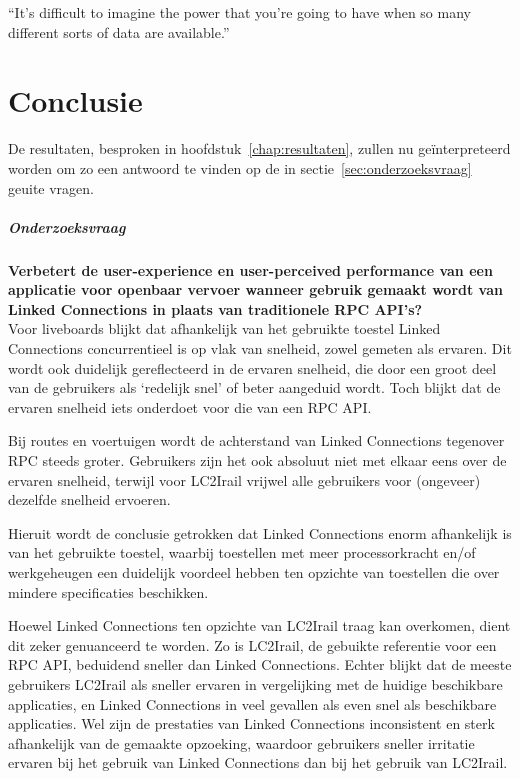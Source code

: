 \begin{savequote}[0.55\linewidth]
	``It’s difficult to imagine the power that you’re going to have when so many different sorts of data are available.''
\end{savequote}

\chapter{Conclusie}
\label{chap:interpretatie}

De resultaten, besproken in hoofdstuk~\ref{chap:resultaten}, zullen nu geïnterpreteerd worden om zo een antwoord te vinden op de in sectie~\ref{sec:onderzoeksvraag} geuite vragen.

\paragraph{Onderzoeksvraag}  \textbf{Verbetert de user-experience en user-perceived performance van een applicatie voor openbaar vervoer wanneer gebruik gemaakt wordt van Linked Connections in plaats van traditionele RPC API's?}\\

Voor liveboards blijkt dat afhankelijk van het gebruikte toestel Linked Connections concurrentieel is op vlak van snelheid, zowel gemeten als ervaren. Dit wordt ook duidelijk gereflecteerd in de ervaren snelheid, die door een groot deel van de gebruikers als `redelijk snel' of beter aangeduid wordt. Toch blijkt dat de ervaren snelheid iets onderdoet voor die van een RPC API.

Bij routes en voertuigen wordt de achterstand van Linked Connections tegenover RPC steeds groter. Gebruikers zijn het ook absoluut niet met elkaar eens over de ervaren snelheid, terwijl voor LC2Irail vrijwel alle gebruikers voor (ongeveer) dezelfde snelheid ervoeren.

Hieruit wordt de conclusie getrokken dat Linked Connections enorm afhankelijk is van het gebruikte toestel,  waarbij toestellen met meer processorkracht en/of werkgeheugen een duidelijk voordeel hebben ten opzichte van toestellen die over mindere specificaties beschikken.

Hoewel Linked Connections ten opzichte van LC2Irail traag kan overkomen, dient dit zeker genuanceerd te worden. Zo is LC2Irail, de gebuikte referentie voor een RPC API, beduidend sneller dan Linked Connections. Echter blijkt dat de meeste gebruikers LC2Irail als sneller ervaren in vergelijking met de huidige beschikbare applicaties, en Linked Connections in veel gevallen als even snel als beschikbare applicaties. Wel zijn de prestaties van Linked Connections inconsistent en sterk afhankelijk van de gemaakte opzoeking, waardoor gebruikers sneller irritatie ervaren bij het gebruik van Linked Connections dan bij het gebruik van LC2Irail.

